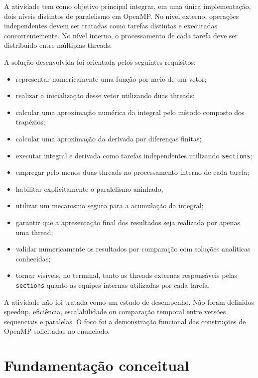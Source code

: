 A atividade tem como objetivo principal integrar, em uma única implementação,
dois níveis distintos de paralelismo em OpenMP. No nível externo, operações
independentes devem ser tratadas como tarefas distintas e executadas
concorrentemente. No nível interno, o processamento de cada tarefa deve ser
distribuído entre múltiplas threads.

A solução desenvolvida foi orientada pelos seguintes requisitos:

\begin{itemize}
    \item representar numericamente uma função por meio de um vetor;
    \item realizar a inicialização desse vetor utilizando duas threads;
    \item calcular uma aproximação numérica da integral pelo método composto
    dos trapézios;
    \item calcular uma aproximação da derivada por diferenças finitas;
    \item executar integral e derivada como tarefas independentes utilizando
    \texttt{sections};
    \item empregar pelo menos duas threads no processamento interno de cada
    tarefa;
    \item habilitar explicitamente o paralelismo aninhado;
    \item utilizar um mecanismo seguro para a acumulação da integral;
    \item garantir que a apresentação final dos resultados seja realizada
    por apenas uma thread;
    \item validar numericamente os resultados por comparação com soluções
    analíticas conhecidas;
    \item tornar visíveis, no terminal, tanto as threads externas responsáveis
    pelas \texttt{sections} quanto as equipes internas utilizadas por cada
    tarefa.
\end{itemize}

A atividade não foi tratada como um estudo de desempenho. Não foram definidos
speedup, eficiência, escalabilidade ou comparação temporal entre versões
sequenciais e paralelas. O foco foi a demonstração funcional das construções
de OpenMP solicitadas no enunciado.


\section{Fundamentação conceitual}
\label{sec:atvd08-fundamentacao}

